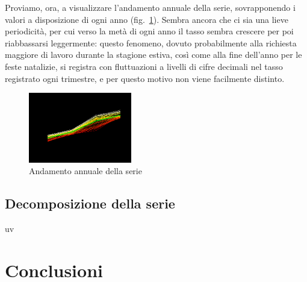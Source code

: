 \documentclass[11pt,a4paper,oneside]{article}
\begin{document}
Proviamo, ora, a visualizzare l'andamento annuale della serie, sovrapponendo i valori a disposizione di ogni anno (fig.~\ref{fig:plotPeriodi}). Sembra ancora che ci sia una lieve periodicità, per cui verso la metà di ogni anno il tasso sembra crescere per poi riabbassarsi leggermente: questo fenomeno, dovuto probabilmente alla richiesta maggiore di lavoro durante la stagione estiva, così come alla fine dell'anno per le feste natalizie, si registra con fluttuazioni a livelli di cifre decimali nel tasso registrato ogni trimestre, e per questo motivo non viene facilmente distinto.
\begin{figure}[h]
\centering
\includegraphics[width=0.4\textwidth]{images/plotPeriodi}
\caption{Andamento annuale della serie}
\label{fig:plotPeriodi}
\end{figure}

\subsection{Decomposizione della serie}
uv

\section{Conclusioni}
\end{document}
